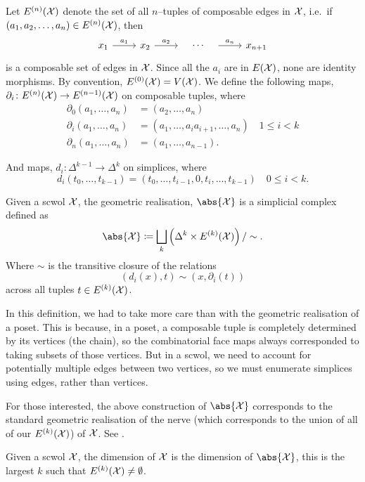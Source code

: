 Let $E^{(n)}(\mathcal{X})$ denote the set of all $n$--tuples of composable edges in $\mathcal{X}$,
i.e.~if $(a_1, a_2, \ldots, a_n) \in E^{(n)}(\mathcal{X})$, then
\[
	\begin{tikzcd}
		x_1 \ar[r, "a_1"] & x_2 \ar[r, "a_2"] & {} \ar[r, phantom, "\cdots"] & {} \ar[r, "a_n"] & x_{n+1}
	\end{tikzcd}
\]
is a composable set of edges in $\mathcal{X}$.
Since all the $a_i$ are in $E(\mathcal{X})$, none are identity morphisms.
By convention, $E^{(0)}(\mathcal{X}) = V(\mathcal{X})$.
We define the following maps, $\partial_i \colon E^{(n)}(\mathcal{X}) \to E^{(n-1)}(\mathcal{X})$ on composable tuples, where
\begin{align*}
	\partial_0(a_1,\ldots,a_n) & = (a_2,\ldots,a_n)                                          \\
	\partial_i(a_1,\ldots,a_n) & = (a_1, \ldots, a_ia_{i+1}, \ldots, a_n) \quad 1 \leq i < k \\
	\partial_n(a_1,\ldots,a_n) & = (a_1, \ldots, a_{n-1})
	.\end{align*}

And maps, $d_i \colon \Delta^{k-1} \to \Delta^k$ on simplices, where
\[
	d_i(t_0, \ldots, t_{k-1}) = (t_0, \ldots, t_{i-1}, 0, t_i, \ldots, t_{k-1}) \quad 0 \leq i < k
	.\]

\begin{definition}
	Given a scwol $\mathcal{X}$, the geometric realisation, $\abs{\calx}$ is a simplicial complex defined as
	\[
		\abs{\calx} \coloneq \bigsqcup_k \left( \Delta^k \times E^{(k)}(\calx) \right) / \sim
		.\]
	Where $\sim$ is the transitive closure of the relations
	\[
		(d_i(x),t) \sim (x, \partial_i(t))
	\]
	across all tuples $t \in E^{(k)}(\mathcal{X})$.
\end{definition}
In this definition, we had to take more care than with the geometric realisation of a poset.
This is because, in a poset, a composable tuple is completely determined by its vertices (the chain), so the combinatorial face maps always corresponded to taking subsets of those vertices.
But in a scwol, we need to account for potentially multiple edges between two vertices, so we must enumerate simplices using edges, rather than vertices.

For those interested, the above construction of $\abs{\calx}$ corresponds to the standard geometric realisation of the nerve (which corresponds to the union of all of our $E^{(k)}(\mathcal{X})$) of $\mathcal{X}$.
See \cite{goerss_simplicial_2009}.

Given a scwol $\mathcal{X}$, the dimension of  $\mathcal{X} $ is the dimension of $\abs{\calx}$, this is the largest  $k$ such that  $E^{(k)}(\mathcal{X}) \neq \emptyset$.

